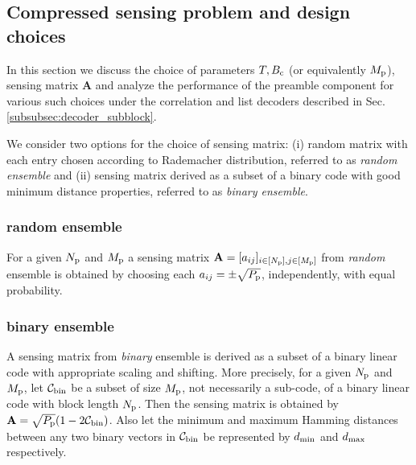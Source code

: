 

\subsection{Compressed sensing problem and design choices}
\label{sec:cs_analysis}
In this section we discuss the choice of parameters $T,B_{\mathrm{c}}$ (or equivalently $M_{\mathrm{p}}$), sensing matrix $\mathbf{A}$ and analyze the performance of the preamble component for various such  choices under the correlation and list decoders described in Sec.\ref{subsubsec:decoder_subblock}. 

We consider two options for the choice of sensing matrix: (i) random matrix with each entry chosen according to Rademacher distribution, referred to as \textit{random ensemble} and (ii) sensing matrix derived as a subset of a binary code with good minimum distance properties, referred to as \textit{binary ensemble}. 

\subsubsection*{random ensemble} 
For a given $N_{\mathrm{p}}$ and $M_{\mathrm{p}}$ a sensing matrix $\mathbf{A}=[a_{ij}]_{i\in[N_{\mathrm{p}}],j\in[M_{\mathrm{p}}]}$ from \emph{random} ensemble is obtained by choosing each $a_{ij}=\pm \sqrt{P_{\mathrm{p}}}$, independently, with equal probability.

\subsubsection*{binary ensemble} 
A sensing matrix from \emph{binary} ensemble is derived as a subset of a binary linear code with appropriate scaling and shifting. More precisely, for a given $N_{\mathrm{p}}$ and $M_{\mathrm{p}}$, let $\mathcal{C}_{\text{bin}}$ be a subset of size $M_{\mathrm{p}}$, not necessarily a sub-code, of a binary linear code with block length $N_{\mathrm{p}}$. Then the sensing matrix is obtained by $\mathbf{A}=\sqrt{P_{\mathrm{p}}}(1-2 \mathcal{C}_{\text{bin}})$. Also let the minimum and maximum Hamming distances between any two binary vectors in $\mathcal{C}_{\text{bin}}$ be represented by $d_{\mathrm{min}}$ and $d_{\mathrm{max}}$ respectively.


